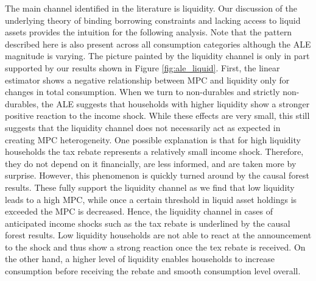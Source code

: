 The main channel identified in the literature is liquidity. Our discussion of the underlying theory of binding borrowing constraints and lacking access to liquid assets provides the intuition for the following analysis. Note that the pattern described here is also present across all consumption categories although the ALE magnitude is varying. The picture painted by the liquidity channel is only in part supported by our results shown in Figure \ref{fig:ale_liquid}. First, the linear estimator shows a negative relationship between MPC and liquidity only for changes in total consumption. When we turn to non-durables and strictly non-durables, the ALE suggests that households with higher liquidity show a stronger positive reaction to the income shock. While these effects are very small, this still suggests that the liquidity channel does not necessarily act as expected in creating MPC heterogeneity. One possible explanation is that for high liquidity households the tax rebate represents a relatively small income shock. Therefore, they do not depend on it financially, are less informed, and are taken more by surprise. However, this phenomenon is quickly turned around by the causal forest results. These fully support the liquidity channel as we find that low liquidity leads to a high MPC, while once a certain threshold in liquid asset holdings is exceeded the MPC is decreased. Hence, the liquidity channel in cases of anticipated income shocks such as the tax rebate is underlined by the causal forest results. Low liquidity households are not able to react at the announcement to the shock and thus show a strong reaction once the tex rebate is received. On the other hand, a higher level of liquidity enables households to increase consumption before receiving the rebate and smooth consumption level overall. \\

